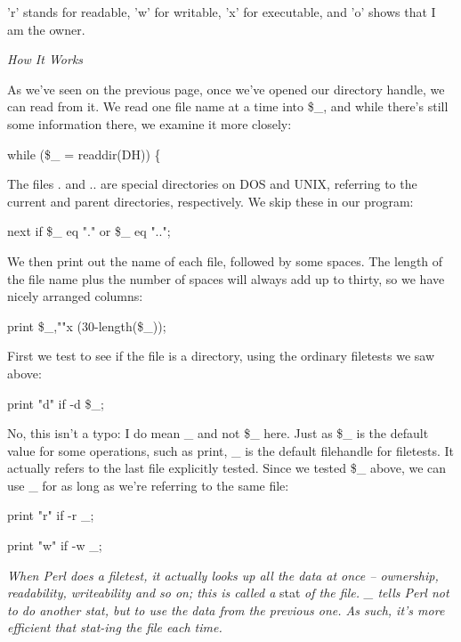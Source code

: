 \documentclass[a4paper,11pt]{book}
\begin{document}
\noindent 'r' stands for readable, 'w' for writable, 'x' for executable, and 'o' shows that I am the owner.

\noindent 

\noindent 

\noindent \textit{How It Works}

\noindent As we've seen on the previous page, once we've opened our directory handle, we can read from it. We read one file name at a time into \$\_, and while there's still some information there, we examine it more closely:

\noindent 

\noindent while (\$\_  = readdir(DH)) \{

\noindent 

\noindent The files . and .. are special directories on DOS and UNIX, referring to the current and parent directories, respectively. We skip these in our program:

\noindent 

\noindent next if \$\_  eq "." or \$\_  eq "..";

\noindent 

\noindent We then print out the name of each file, followed by some spaces. The length of the file name plus the number of spaces will always add up to thirty, so we have nicely arranged columns:

\noindent 

\noindent print \$\_,""x (30-length(\$\_));

\noindent 

\noindent First we test to see if the file is a directory, using the ordinary filetests we saw above:

\noindent 

\noindent print "d" if -d \$\_;

\noindent 

\noindent No, this isn't a typo: I do mean \_ and not \$\_ here. Just as \$\_ is the default value for some operations, such as print,  \_ is the default filehandle for filetests. It actually refers to the last file explicitly tested. Since we tested \$\_ above, we can use \_ for as long as we're referring to the same file:

\noindent 

\noindent print "r" if -r \_;

\noindent print "w" if -w \_;

\noindent 

\noindent 

\noindent \textit{When Perl does a filetest, it actually looks up all the data at once -- ownership, readability, writeability and so on; this is called a }stat \textit{of the file. \_ tells Perl not to do another stat, but to use the data from the previous one. As such, it's more efficient that stat-ing the file each time.}
\end{document}
